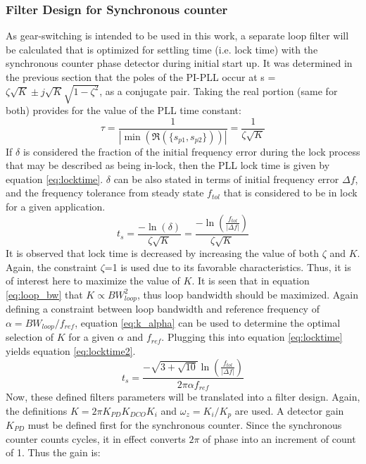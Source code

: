 		\subsubsection{Filter Design for Synchronous counter}
			As gear-switching is intended to be used in this work, a separate loop filter will be calculated that is optimized for settling time (i.e. lock time) with the synchronous counter phase detector during initial start up. It was determined in the previous section that the poles of the PI-PLL occur at s = $\zeta\sqrt{K} \pm j\sqrt{K}\sqrt{1-\zeta^2}$, as a conjugate pair. Taking the real portion (same for both) provides for the value of the PLL time constant:
			\begin{equation}
				\tau = \frac{1}{|\min(\Re(\{s_{p1}, s_{p2}\}))|} = \frac{1}{\zeta\sqrt{K}}
			\end{equation}
			If $\delta$ is considered the fraction of the initial frequency error during the lock process that may be described as being in-lock, then the PLL lock time is given by equation \ref{eq:locktime}. $\delta$ can be also stated in terms of initial frequency error $\Delta f$, and the frequency tolerance from steady state $f_{tol}$ that is considered to be in lock for a given application.
			\begin{equation}\label{eq:locktime}
				t_s = \frac{-\ln(\delta)}{\zeta\sqrt{K}} = \frac{-\ln\left(\frac{f_{tol}}{|\Delta f|}\right)}{\zeta\sqrt{K}}
			\end{equation}
			It is observed that lock time is decreased by increasing the value of both $\zeta$ and $K$. Again, the constraint $\zeta$=1 is used due to its favorable characteristics. Thus, it is of interest here to maximize the value of $K$. It is seen that in equation \ref{eq:loop_bw} that $K\propto BW_{loop}^2$, thus loop bandwidth should be maximized. Again defining a constraint between loop bandwidth and reference frequency of $\alpha = BW_{loop}/f_{ref}$, equation \ref{eq:k_alpha} can be used to determine the optimal selection of $K$ for a given $\alpha$ and $f_{ref}$. Plugging this into equation \ref{eq:locktime} yields equation \ref{eq:locktime2}.
			\begin{equation}\label{eq:locktime2}
				t_s =  \frac{-\sqrt{3+\sqrt{10}}\ln\left(\frac{f_{tol}}{|\Delta f|}\right)}{2\pi\alpha f_{ref}}
			\end{equation}
			Now, these defined filters parameters will be translated into a filter design. Again, the definitions $K=2\pi K_{PD}K_{DCO}K_{i}$ and $\omega_z = K_i/K_p$ are used. A detector gain $K_{PD}$ must be defined first for the synchronous counter. Since the synchronous counter counts cycles, it in effect converts $2\pi$ of phase into an increment of count of 1. Thus the gain is:
